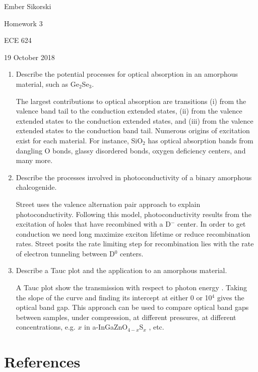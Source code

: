 \documentclass[12pt]{elsarticle}
\newcommand{\vs}{\vspace{2mm}}
\begin{document}
\begin{flushright}
	Ember Sikorski\par
	Homework 3\par
	ECE 624\par 
	19 October 2018
\end{flushright}


\begin{enumerate}
\item Describe the potential processes for optical absorption in an amorphous material, such as Ge$_{2}$Se$_{3}$. \par \vs

The largest contributions to optical absorption are transitions (i) from the valence band tail to the conduction extended states, (ii) from the valence extended states to the conduction extended states, and (iii) from the valence extended states to the conduction band tail. Numerous origins of excitation exist for each material. For instance, SiO$_{2}$ \cite{Skuja2005} has optical absorption bands from dangling O bonds, glassy disordered bonds, oxygen deficiency centers, and many more.
\vs 
\item Describe the processes involved in photoconductivity of a binary amorphous chalcogenide. \par \vs

Street \cite{Street1975} uses the valence alternation pair approach to explain photoconductivity. Following this model, photoconductivity results from the excitation of holes that have recombined with a D$^{-}$ center. In order to get conduction we need long maximize exciton lifetime \cite{Mott1987} or reduce recombination rates. Street \cite{Street1975} posits the rate limiting step for recombination lies with the rate of electron tunneling between D$^{0}$ centers.

\vs
\item Describe a Tauc plot and the application to an amorphous material. \par \vs
A Tauc plot show the transmission with respect to photon energy \cite{Zallen1983,Kim2015}. Taking the slope of the curve and finding its intercept at either 0 or 10$^{4}$ gives the optical band gap. This approach can be used to compare optical band gaps between samples, under compression, at different pressures, at different concentrations, e.g. $x$ in a-InGaZnO$_{4-x}$S$_{x}$ \cite{Kim2015}, etc.

\end{enumerate}


\section*{References}


\end{document}
